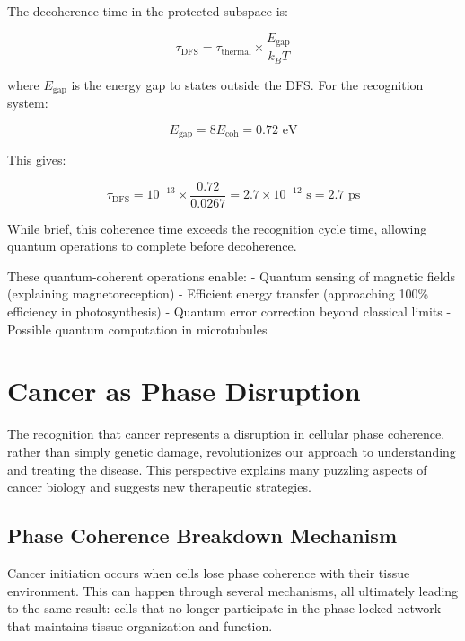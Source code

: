 \documentclass[12pt,a4paper]{report}
\begin{document}
The decoherence time in the protected subspace is:

\begin{equation}
\tau_{\text{DFS}} = \tau_{\text{thermal}} \times \frac{E_{\text{gap}}}{k_B T}
\end{equation}

where $E_{\text{gap}}$ is the energy gap to states outside the DFS. For the recognition system:

\begin{equation}
E_{\text{gap}} = 8 E_{\text{coh}} = 0.72 \text{ eV}
\end{equation}

This gives:

\begin{equation}
\tau_{\text{DFS}} = 10^{-13} \times \frac{0.72}{0.0267} = 2.7 \times 10^{-12} \text{ s} = 2.7 \text{ ps}
\end{equation}

While brief, this coherence time exceeds the recognition cycle time, allowing quantum operations to complete before decoherence.

These quantum-coherent operations enable:
- Quantum sensing of magnetic fields (explaining magnetoreception)
- Efficient energy transfer (approaching 100\% efficiency in photosynthesis)
- Quantum error correction beyond classical limits
- Possible quantum computation in microtubules

\section{Cancer as Phase Disruption}

The recognition that cancer represents a disruption in cellular phase coherence, rather than simply genetic damage, revolutionizes our approach to understanding and treating the disease. This perspective explains many puzzling aspects of cancer biology and suggests new therapeutic strategies.

\subsection{Phase Coherence Breakdown Mechanism}

Cancer initiation occurs when cells lose phase coherence with their tissue environment. This can happen through several mechanisms, all ultimately leading to the same result: cells that no longer participate in the phase-locked network that maintains tissue organization and function.
\end{document}

